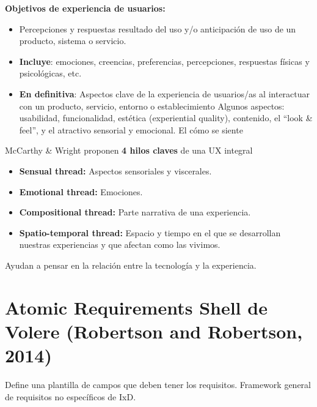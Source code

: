 \documentclass[12pt, twoside, openright]{report} %
\begin{document}
\textbf{Objetivos de experiencia de usuarios:}

\begin{itemize}
	\item Percepciones y respuestas resultado del uso y/o anticipación de uso de
	      un producto, sistema o servicio.
	\item \textbf{Incluye}: emociones, creencias, preferencias, percepciones, respuestas
	      físicas y psicológicas, etc.
	\item \textbf{En definitiva}: Aspectos clave de la experiencia de usuarios/as al
	      interactuar con un producto, servicio, entorno o establecimiento
	      Algunos aspectos: usabilidad, funcionalidad, estética (experiential
	      quality), contenido, el \enquote{look \& feel}, y el atractivo sensorial y
	      emocional. El cómo se siente
\end{itemize}

McCarthy \& Wright proponen \textbf{4 hilos claves} de una UX integral

\begin{itemize}
	\item \textbf{Sensual thread:} Aspectos sensoriales y viscerales.
	\item \textbf{Emotional thread:} Emociones.
	\item \textbf{Compositional thread:} Parte narrativa de una experiencia.
	\item \textbf{Spatio-temporal thread:} Espacio y tiempo en el que se desarrollan
	      nuestras experiencias y que afectan como las vivimos.
\end{itemize}

Ayudan a pensar en la relación entre la tecnología y la experiencia.

\newpage

\section{Atomic Requirements Shell de Volere (Robertson and
  Robertson, 2014)}

Define una plantilla de campos que deben tener los requisitos. Framework
general de requisitos no específicos de IxD.
\end{document}
